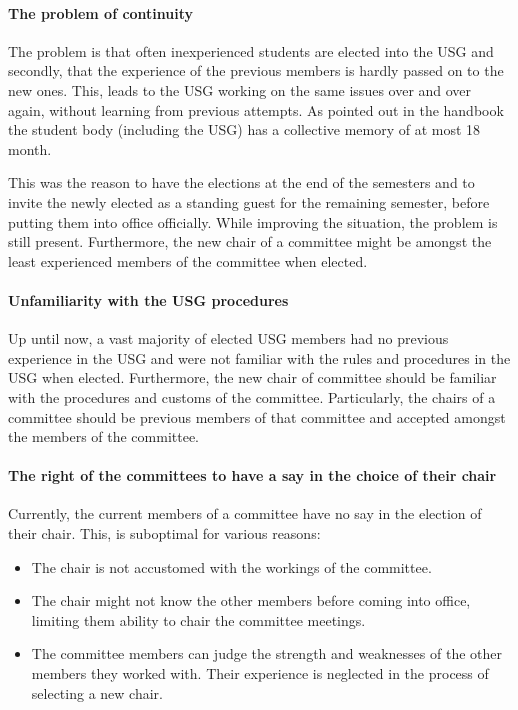 \paragraph{The problem of continuity} The problem is that often inexperienced students are elected into the USG and secondly, that the experience of the previous members is hardly passed on to the new ones. This, leads to the USG working on the same issues over and over again, without learning from previous attempts. As pointed out in the handbook the student body (including the USG) has a collective memory of at most 18 month.

This was the reason to have the elections at the end of the semesters and to invite the newly elected as a standing guest for the remaining semester, before putting them into office officially. While improving the situation, the problem is still present. Furthermore, the new chair of a committee might be amongst the least experienced members of the committee when elected. 

\paragraph{Unfamiliarity with the USG procedures} Up until now, a vast majority of elected USG members had no previous experience in the USG and were not familiar with the rules and procedures in the USG when elected. Furthermore, the new chair of committee should be familiar with the procedures and customs of the committee.  Particularly, the chairs of a committee should be previous members of that committee and accepted amongst the members of the committee.

\paragraph{The right of the committees to have a say in the choice of their chair}
Currently, the current members of a committee have no say in the election of their chair. This, is suboptimal for various reasons: \begin{itemize}
	\item The chair is not accustomed with the workings of the committee. 
	\item The chair might not know the other members before coming into office, limiting them ability to chair the committee meetings. 
	\item The committee members can judge the strength and weaknesses of the other members they worked with. Their experience is neglected in the process of selecting a new chair.
\end{itemize}

